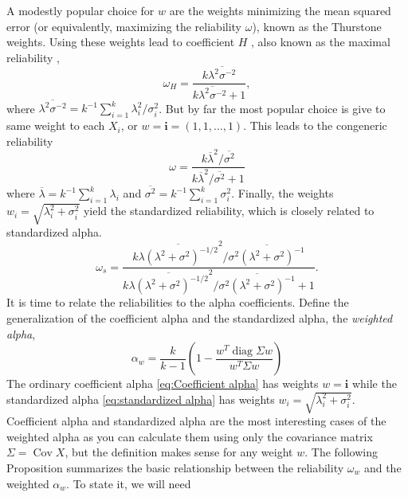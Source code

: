 \documentclass{article}
\theoremstyle{plain}
\theoremstyle{plain}
\theoremstyle{definition}
\theoremstyle{remark}
\theoremstyle{definition}
\theoremstyle{plain}
\theoremstyle{plain}
\theoremstyle{definition}
\DeclareMathOperator{\Cov}{Cov}
\DeclareMathOperator{\diag}{diag}
\begin{document}
A modestly popular choice for $w$ are the weights minimizing the mean squared error (or equivalently, maximizing the reliability $\omega$), known as the Thurstone \citep{thurshronebook} weights. Using these weights lead to coefficient $H$ \citep{hancock2001rethinking}, also known as the maximal reliability \citep{Li1997-yh}, 
\begin{equation}
\label{eq:coefficient_H}
\omega_{H}=\frac{k\overline{\lambda^{2}\sigma^{-2}}}{k\overline{\lambda^{2}\sigma^{-2}}+1},
\end{equation}
where $\overline{\lambda^{2}\sigma^{-2}} = k^{-1}\sum_{i=1}^{k}\lambda_{i}^2/\sigma_i^2$. But by far the most popular choice is give to same weight to each $X_i$, or $w = \mathbf{i}=\left(1,1,\ldots,1\right)$. This leads to the congeneric reliability
\begin{equation}
\omega =\frac{k\overline{\lambda}^{2}/\overline{\sigma^{2}}}{k\overline{\lambda}^{2}/\overline{\sigma^{2}} + 1}\label{eq:Congeneric reliability}
\end{equation}
where $\overline{\lambda}=k^{-1}\sum_{i=1}^{k}\lambda_{i}$ and
$\overline{\sigma^{2}}=k^{-1}\sum_{i=1}^{k}\sigma_{i}^{2}$. Finally, the weights $w_i = \sqrt{\lambda_i^2 + \sigma_i^2}$ yield the standardized reliability, which is closely related to standardized alpha.
\begin{equation}
\omega_s=\frac{k\overline{\lambda(\lambda^{2}+\sigma^{2})^{-1/2}}^{2}/\overline{\sigma^{2}(\lambda^{2}+\sigma^{2})^{-1}}}{k\overline{\lambda(\lambda^{2}+\sigma^{2})^{-1/2}}^{2}/\overline{\sigma^{2}(\lambda^{2}+\sigma^{2})^{-1}}+1}.\label{eq:Standardized reliability}
\end{equation}
It is time to relate the reliabilities to the alpha coefficients.
Define the generalization of the coefficient alpha and the standardized
alpha, the \emph{weighted alpha},
\begin{equation}
\alpha_{w}=\frac{k}{k-1}\left(1-\frac{w^{T}\diag\Sigma w}{w^{T}\Sigma w}\right)\label{eq:weighted alpha}
\end{equation}
The ordinary coefficient alpha \eqref{eq:Coefficient alpha} has weights $w=\mathbf{i}$
while the standardized alpha \eqref{eq:standardized alpha} has weights $w_{i}=\sqrt{\lambda_{i}^{2}+\sigma_{i}^{2}}$. Coefficient alpha and standardized alpha are the most interesting cases of the weighted alpha as you can calculate them using only the covariance matrix $\Sigma = \Cov X$, but the definition makes sense for any weight $w$. The following Proposition summarizes the basic relationship
between the reliability $\omega_{w}$ and the weighted $\alpha_{w}$. To state it, we will need
\end{document}
